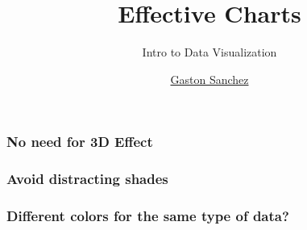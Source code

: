 \documentclass[12pt]{beamer}\usepackage[]{graphicx}\usepackage[]{color}
\title{Effective Charts}
\subtitle{Intro to Data Visualization}
\author{\href{http://www.gastonsanchez.com}{Gaston Sanchez}}
\institute{\href{https://creativecommons.org/licenses/by-sa/4.0/}{\tt \scriptsize \color{foreground} CC BY-SA 4.0}}
\date{}
\begin{document}
{
  \frame{\titlepage} 
}


\begin{frame}
\begin{center}
\Huge{}
\end{center}
\end{frame}


\begin{frame}
\frametitle{}
\begin{center}
\end{center}
\end{frame}


\begin{frame}
\begin{center}
\Huge{}
\end{center}
\end{frame}


\begin{frame}
\frametitle{No need for 3D Effect}
\begin{center}
\end{center}
\end{frame}


\begin{frame}
\frametitle{Avoid distracting shades}
\begin{center}
\end{center}
\end{frame}


\begin{frame}
\frametitle{Different colors for the same type of data?}
\begin{center}
\end{center}
\end{frame}

\end{document}
